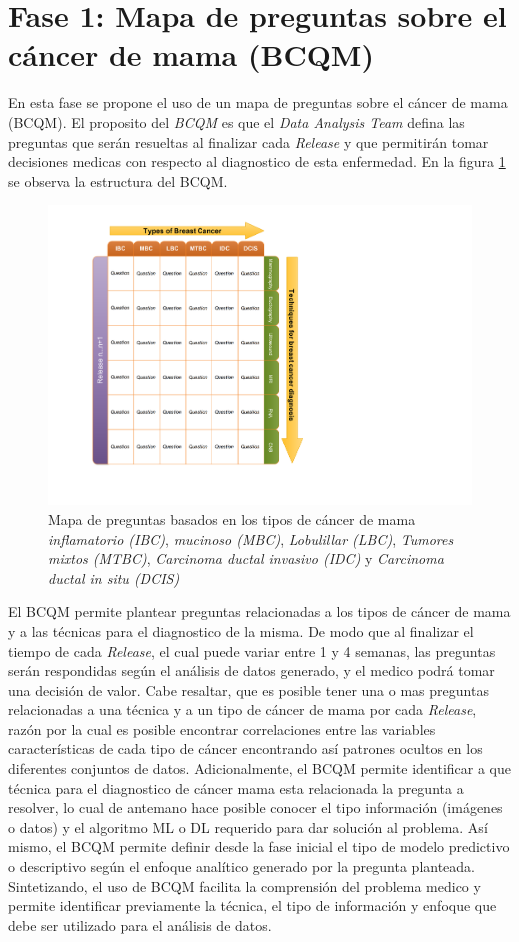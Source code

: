 \section{Fase 1: Mapa de preguntas sobre el cáncer de mama (BCQM)} 
En esta fase se propone el uso de un mapa de preguntas sobre el cáncer de mama (BCQM). El proposito del \textit{BCQM} es que el \textit{Data Analysis Team} defina las preguntas que serán resueltas al finalizar cada \textit{Release} y que permitirán tomar decisiones medicas con respecto al diagnostico de esta enfermedad. En la figura \ref{BCQM} se observa la estructura del BCQM.

\begin{figure}
	\centering
	\includegraphics[width=0.6
	\linewidth]{IMAGENES/BCQM}
	\caption{Mapa de preguntas basados en los tipos de cáncer de mama \textit{inflamatorio (IBC)}, \textit{mucinoso (MBC)}, \textit{Lobulillar (LBC)}, \textit{Tumores mixtos (MTBC)}, \textit{Carcinoma ductal invasivo (IDC)} y \textit{Carcinoma ductal in situ (DCIS)}}
	\label{BCQM}
\end{figure}

El BCQM permite plantear preguntas relacionadas a los tipos de cáncer de mama y a las técnicas para el diagnostico de la misma. De modo que al finalizar el tiempo de cada \textit{Release}, el cual puede variar entre 1 y 4 semanas, las preguntas serán respondidas según el análisis de datos generado, y el medico podrá tomar una decisión de valor. Cabe resaltar, que es posible tener una o mas preguntas relacionadas a una técnica y a un tipo de cáncer de mama por cada \textit{Release}, razón por la cual es posible encontrar correlaciones entre las variables características de cada tipo de cáncer encontrando así patrones ocultos en los diferentes conjuntos de datos. Adicionalmente, el BCQM permite identificar a que técnica para el diagnostico de cáncer mama esta relacionada la pregunta a resolver, lo cual de antemano hace posible conocer el tipo información (imágenes o datos) y el algoritmo  ML o DL requerido para dar solución al problema. Así mismo, el BCQM permite definir desde la fase inicial el tipo de modelo predictivo o descriptivo según el enfoque analítico generado por la pregunta planteada. Sintetizando, el uso de BCQM facilita la comprensión del problema medico y permite identificar previamente la técnica, el tipo de información y enfoque que debe ser utilizado para el análisis de datos.  